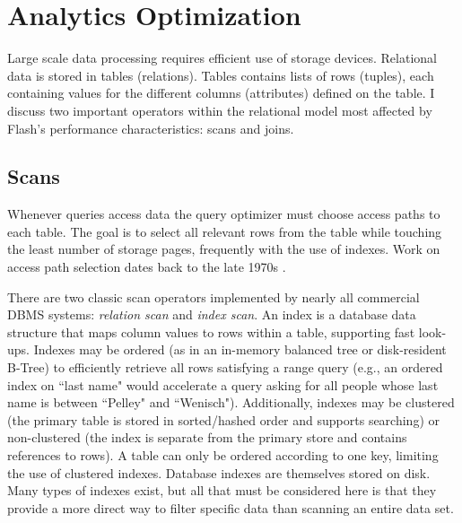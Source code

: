 \section{Analytics Optimization}
\label{sec:Background:Analytics}

Large scale data processing requires efficient use of storage devices.
Relational data is stored in tables (relations).
Tables contains lists of rows (tuples), each containing values for the different columns (attributes) defined on the table.
I discuss two important operators within the relational model most affected by Flash's performance characteristics: scans and joins.

\subsection{Scans}
\label{sec:Background:Scans}

Whenever queries access data the query optimizer must choose access paths to each table. 
The goal is to select all relevant rows from the table while touching the least number of storage pages, frequently with the use of indexes.
Work on access path selection dates back to the late 1970s \cite{Selinger1979}.

There are two classic scan operators implemented by nearly all commercial DBMS systems: \emph{relation scan} and \emph{index scan}.
An index is a database data structure that maps column values to rows within a table, supporting fast look-ups.
Indexes may be ordered (as in an in-memory balanced tree or disk-resident B-Tree) to efficiently retrieve all rows satisfying a range query (e.g., an ordered index on ``last name" would accelerate a query asking for all people whose last name is between ``Pelley" and ``Wenisch").
Additionally, indexes may be clustered (the primary table is stored in sorted/hashed order and supports searching) or non-clustered (the index is separate from the primary store and contains references to rows).
A table can only be ordered according to one key, limiting the use of clustered indexes.
Database indexes are themselves stored on disk.
Many types of indexes exist, but all that must be considered here is that they provide a more direct way to filter specific data than scanning an entire data set.

